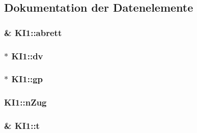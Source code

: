 \subsection{Dokumentation der Datenelemente}
\hypertarget{class_k_i1_ab11a69872d58de0a6baf432518faf25e}{}
\subsubsection[{abrett}]{\& K\+I1\+::abrett\hspace{0.3cm}{\ttfamily [private]}}\label{class_k_i1_ab11a69872d58de0a6baf432518faf25e}
\hypertarget{class_k_i1_ab62258d3c6f9e703764e473b2536b878}{}
\subsubsection[{dv}]{$\ast$ K\+I1\+::dv\hspace{0.3cm}{\ttfamily [private]}}\label{class_k_i1_ab62258d3c6f9e703764e473b2536b878}
\hypertarget{class_k_i1_a96c4058b36c769ac3a3fa9ddb90327f1}{}
\subsubsection[{gp}]{$\ast$ K\+I1\+::gp\hspace{0.3cm}{\ttfamily [private]}}\label{class_k_i1_a96c4058b36c769ac3a3fa9ddb90327f1}
\hypertarget{class_k_i1_a8cd4dc954c817c90e2fc3afcdde0688d}{}
\subsubsection[{n\+Zug}]{ K\+I1\+::n\+Zug\hspace{0.3cm}{\ttfamily [private]}}\label{class_k_i1_a8cd4dc954c817c90e2fc3afcdde0688d}
\hypertarget{class_k_i1_a2d2569bdd2b1eb3bd9ed00efed2e46d4}{}
\subsubsection[{t}]{\& K\+I1\+::t\hspace{0.3cm}{\ttfamily [private]}}\label{class_k_i1_a2d2569bdd2b1eb3bd9ed00efed2e46d4}
\hypertarget{class_k_i1_a4c25d6f211ec7c1ad8979f36b3bd9275}{}
